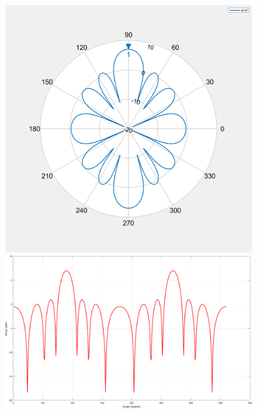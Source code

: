 \documentclass[12pt,a4paper]{article}
\begin{document}
{\begin{center}
\begin{figure}[h]
\includegraphics[scale=0.3]{array_factor_polar.png}
\includegraphics[scale=0.3]{array_factor_rectangular.png}
\end{figure}
\end{center}

\newpage
}
\end{document}
